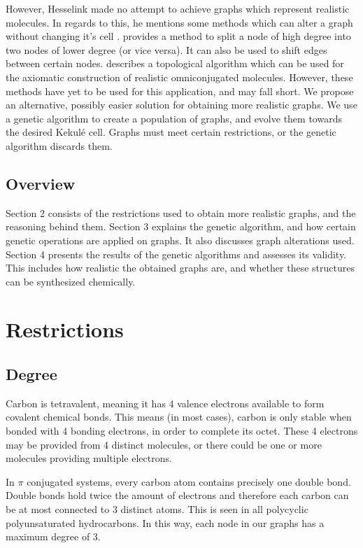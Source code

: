 \documentclass[12pt]{article}
\begin{document}
However, Hesselink made no attempt to achieve graphs which represent realistic molecules. In regards to this, he mentions some methods which can alter a graph without changing it's cell \cite{HH13, v06}. \cite{HH13} provides a method to split a node of high degree into two nodes of lower degree (or vice versa). It can also be used to shift edges between certain nodes. \cite{v06} describes a topological algorithm which can be used for the axiomatic construction of realistic omniconjugated molecules. However, these methods have yet to be used for this application, and may fall short. We propose an alternative, possibly easier solution for obtaining more realistic graphs. We use a genetic algorithm to create a population of graphs, and evolve them towards the desired Kekul\'e cell. Graphs must meet certain restrictions, or the genetic algorithm discards them.

\subsection{Overview}

Section 2 consists of the restrictions used to obtain more realistic graphs, and the reasoning behind them. Section 3 explains the genetic algorithm, and how certain genetic operations are applied on graphs. It also discusses graph alterations used. Section 4 presents the results of the genetic algorithms and assesses its validity. This includes how realistic the obtained graphs are, and whether these structures can be synthesized chemically. %

\section{Restrictions}

\subsection{Degree}

Carbon is tetravalent, meaning it has 4 valence electrons available to form covalent chemical bonds. This means (in most cases), carbon is only stable when bonded with 4 bonding electrons, in order to complete its octet. These 4 electrons may be provided from 4 distinct molecules, or there could be one or more molecules providing multiple electrons.

In $\pi$ conjugated systems, every carbon atom contains precisely one double bond. Double bonds hold twice the amount of electrons and therefore each carbon can be at most connected to 3 distinct atoms. This is seen in all polycyclic polyunsaturated hydrocarbons. In this way, each node in our graphs has a maximum degree of 3. 
\end{document}
